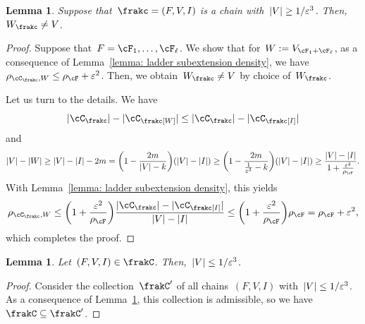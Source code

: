 \documentclass[11pt]{amsart}
\newcommand{\eps}{\varepsilon}
\DeclarePairedDelimiter{\paren}{\lparen}{\rparen}
\DeclarePairedDelimiter{\abs}{\lvert}{\rvert}
\newtheorem{lemma}[algocf]{Lemma}
\theoremstyle{definition}
\numberwithin{equation}{section}
\begin{document}
	\begin{lemma}\label{lemma: too large is not reduced}
		Suppose that~$\frakc=(F,V,I)$ is a chain with~$\abs{V}\geq 1/\eps^3$.
		Then,~$W_{\frakc}\neq V$.
	\end{lemma}
	\begin{proof}
		Suppose that~$F=\cF_1,\ldots,\cF_\ell$.
		We show that for~$W:=V_{\cF_1+\cF_\ell}$, as a consequence of Lemma~\ref{lemma: ladder subextension density}, we have~$\rho_{\cC_{\frakc},W}\leq \rho_\cF+\eps^2$.
		Then, we obtain~$W_{\frakc}\neq V$ by choice of~$W_{\frakc}$.
		
		Let us turn to the details.
		We have
		\begin{equation*}
			\abs{\cC_\frakc}-\abs{\cC_\frakc[W]}\leq \abs{\cC_\frakc}-\abs{\cC_\frakc[I]}
		\end{equation*}
		and
		\begin{equation*}
			\abs{V}-\abs{W}\geq \abs{V}-\abs{I}-2m
			=\paren[\bigg]{1-\frac{2m}{\abs{V}-k}}(\abs{V}-\abs{I})
			\geq \paren[\bigg]{1-\frac{2m}{\frac{1}{\eps^3}-k}}(\abs{V}-\abs{I})
			\geq \frac{\abs{V}-\abs{I}}{1+\frac{\eps^2}{\rho_\cF}}.
		\end{equation*}
		With Lemma~\ref{lemma: ladder subextension density}, this yields
		\begin{equation*}
			\rho_{\cC_{\frakc},W}
			\leq \paren[\bigg]{1+\frac{\eps^2}{\rho_\cF}}\frac{\abs{\cC_\frakc}-\abs{\cC_\frakc[I]}}{\abs{V}-\abs{I}}
			\leq \paren[\bigg]{1+\frac{\eps^2}{\rho_\cF}}\rho_\cF
			=\rho_\cF+\eps^2,
		\end{equation*}
		which completes the proof.
	\end{proof}
	
	\begin{lemma}\label{lemma: chain size}
		Let~$(F,V,I)\in\frakC$.
		Then,~$\abs{V}\leq 1/\eps^3$.
	\end{lemma}
	\begin{proof}
		Consider the collection~$\frakC'$ of all chains~$(F,V,I)$ with~$\abs{V}\leq 1/\eps^3$.
		As a consequence of Lemma~\ref{lemma: too large is not reduced}, this collection is admissible, so we have~$\frakC\subseteq \frakC'$.
	\end{proof}
	
	
	
\end{document}
